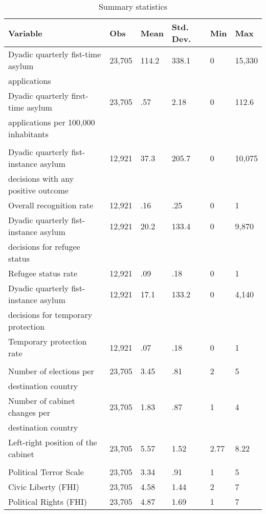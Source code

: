 \begin{table}[htbp]
	\centering
	\footnotesize
	\caption{Summary statistics}
	\label{app_summary_statistics}
\begin{tabularx}{\textwidth}{l YYYYY }\hline\hline
Variable & Obs & Mean & Std. Dev. & Min & Max  \\ \hline
Dyadic quarterly fist-time asylum & 23,705 & 114.2 & 338.1 & 0 & 15,330  \\
applications & & & &  &   \\
[0.3em]
Dyadic quarterly first-time asylum  & 23,705 & .57 & 2.18 & 0 & 112.6  \\
applications per 100,000 inhabitants & & & &  &   \\
[0.3em]
\\
Dyadic quarterly fist-instance asylum & 12,921 & 37.3 & 205.7 & 0 & 10,075  \\
  decisions with any positive outcome & & & &  &   \\
[0.3em]
Overall recognition rate & 12,921 & .16 & .25 & 0 & 1  \\
[0.6em]
Dyadic quarterly fist-instance asylum  & 12,921 & 20.2 & 133.4 & 0 & 9,870  \\
 decisions for refugee status & & & &  &   \\
[0.3em]
Refugee status rate & 12,921 & .09 & .18 & 0 & 1  \\
[0.6em]
Dyadic quarterly fist-instance asylum   & 12,921 & 17.1 & 133.2 & 0 & 4,140  \\
decisions for temporary protection& & & &  &   \\
[0.3em]
Temporary protection rate & 12,921 & .07 & .18 & 0 & 1  \\
[0.3em]
\\
Number of elections per  & 23,705 & 3.45 & .81 & 2 & 5  \\
 destination country & & & &  &   \\
[0.3em]
Number of cabinet changes per & 23,705 & 1.83 & .87 & 1 & 4  \\
 destination country & & & &  &   \\
[0.3em]
Left-right position of the cabinet & 23,705 & 5.57 & 1.52 & 2.77 & 8.22  \\
\\
[0.3em]
Political Terror Scale & 23,705 & 3.34 & .91 & 1 & 5  \\
[0.3em]
Civic Liberty (FHI) & 23,705 & 4.58 & 1.44 & 2 & 7  \\
[0.3em]
Political Rights (FHI) & 23,705 & 4.87 & 1.69 & 1 & 7  \\

\end{tabularx}
\end{table}
